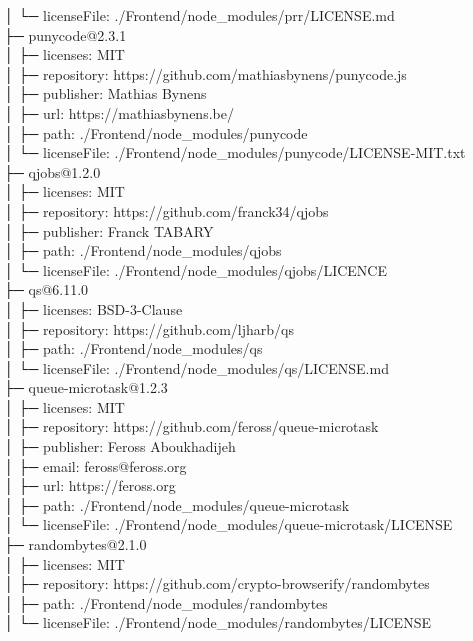 │  └─ licenseFile: ./Frontend/node\_modules/prr/LICENSE.md\\
├─ punycode@2.3.1\\
│  ├─ licenses: MIT\\
│  ├─ repository: https://github.com/mathiasbynens/punycode.js\\
│  ├─ publisher: Mathias Bynens\\
│  ├─ url: https://mathiasbynens.be/\\
│  ├─ path: ./Frontend/node\_modules/punycode\\
│  └─ licenseFile: ./Frontend/node\_modules/punycode/LICENSE-MIT.txt\\
├─ qjobs@1.2.0\\
│  ├─ licenses: MIT\\
│  ├─ repository: https://github.com/franck34/qjobs\\
│  ├─ publisher: Franck TABARY\\
│  ├─ path: ./Frontend/node\_modules/qjobs\\
│  └─ licenseFile: ./Frontend/node\_modules/qjobs/LICENCE\\
├─ qs@6.11.0\\
│  ├─ licenses: BSD-3-Clause\\
│  ├─ repository: https://github.com/ljharb/qs\\
│  ├─ path: ./Frontend/node\_modules/qs\\
│  └─ licenseFile: ./Frontend/node\_modules/qs/LICENSE.md\\
├─ queue-microtask@1.2.3\\
│  ├─ licenses: MIT\\
│  ├─ repository: https://github.com/feross/queue-microtask\\
│  ├─ publisher: Feross Aboukhadijeh\\
│  ├─ email: feross@feross.org\\
│  ├─ url: https://feross.org\\
│  ├─ path: ./Frontend/node\_modules/queue-microtask\\
│  └─ licenseFile: ./Frontend/node\_modules/queue-microtask/LICENSE\\
├─ randombytes@2.1.0\\
│  ├─ licenses: MIT\\
│  ├─ repository: https://github.com/crypto-browserify/randombytes\\
│  ├─ path: ./Frontend/node\_modules/randombytes\\
│  └─ licenseFile: ./Frontend/node\_modules/randombytes/LICENSE\\

